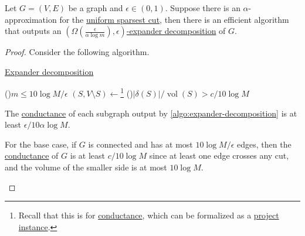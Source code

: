 \begin{theorem}\label{thm:expander-decomposition}
	Let \(G=(V, E)\) be a graph and \(\epsilon \in (0, 1)\). Suppose there is an \(\alpha \)-approximation for the \hyperref[prb:sparsest-cut]{uniform sparsest cut}, then there is an efficient algorithm that outputs an \hyperref[def:expander-decomposition]{\((\Omega (\frac{\epsilon }{\alpha \log m}), \epsilon )\)-expander decomposition} of \(G\).
\end{theorem}
\begin{proof}
	Consider the following algorithm.

	\begin{algorithm}[H]\label{algo:expander-decomposition}
		\DontPrintSemicolon{}
		\caption{\hyperref[def:expander-decomposition]{Expander decomposition}}

		\BlankLine

		\If(){\(m \leq 10 \log M / \epsilon \)}{
			\;
		}
		\;
		\((S, V\setminus S) \gets\)\footnote{Recall that this is for \hyperref[def:conductance]{conductance}, which can be formalized as a \hyperref[prb:product-instance-of-sparsest-cut]{project instance}.}
		\;
		\uIf(){\(\lvert \delta (S) \rvert / \operatorname{vol}(S) > c / 10 \log M\)}{
			\;
		}
	\end{algorithm}

	\begin{claim}
		The \hyperref[def:conductance]{conductance} of each subgraph output by \autoref{algo:expander-decomposition} is at least \(\epsilon / 10 \alpha \log M\).
	\end{claim}
	\begin{explanation}
		For the base case, if \(G\) is connected and has at most \(10 \log M / \epsilon \) edges, then the \hyperref[def:conductance]{conductance} of \(G\) is at least \(c / 10 \log M\) since at least one edge crosses any cut, and the volume of the smaller side is at most \(10 \log M\).


\end{explanation}
\end{proof}
